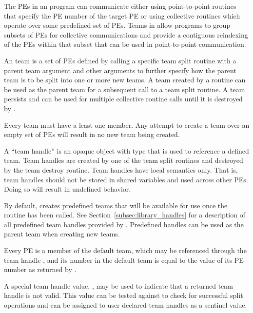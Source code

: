 The \acp{PE} in an \openshmem program can communicate either using
point-to-point routines that specify the \ac{PE} number of the target
\ac{PE} or using collective routines which operate over some predefined
set of \acp{PE}. Teams in \openshmem allow programs to group subsets
of \acp{PE} for collective communications and provide a contiguous reindexing
of the \acp{PE} within that subset that can be used in point-to-point communication.

An \openshmem team is a set of \acp{PE} defined by calling a specific team
split routine with a parent team argument and other arguments to further
specify how the parent team is to be split into one or more new teams.
A team created by a  routine can be used as the parent team
for a subsequent call to a team split routine.  A team persists and can
be used for multiple collective routine calls until it is destroyed by
.

Every team must have a least one member. Any attempt to create a team over an
empty set of \acp{PE} will result in no new team being created.

A ``team handle'' is an opaque object with type  that is used
to reference a defined team.  Team handles are created by one of the team split
routines and destroyed by the team destroy routine. Team handles have local
semantics only. That is, team handles should not be stored in shared variables
and used across other \acp{PE}. Doing so will result in undefined behavior.

By default, \openshmem creates predefined teams that will be available
for use once the routine  has been called. See
Section~\ref{subsec:library_handles} for a description of all predefined team handles
provided by \openshmem. Predefined  handles can be used as
the parent team when creating new \openshmem teams.

Every \ac{PE} is a member of the default team, which may be referenced
through the team handle ,
and its number in the default team is equal to the
value of its \ac{PE} number as returned by .

A special team handle value, , may be used to
indicate that a returned team handle is not valid. This value can be tested
against to check for successful split operations and can be assigned to user
declared team handles as a sentinel value.

